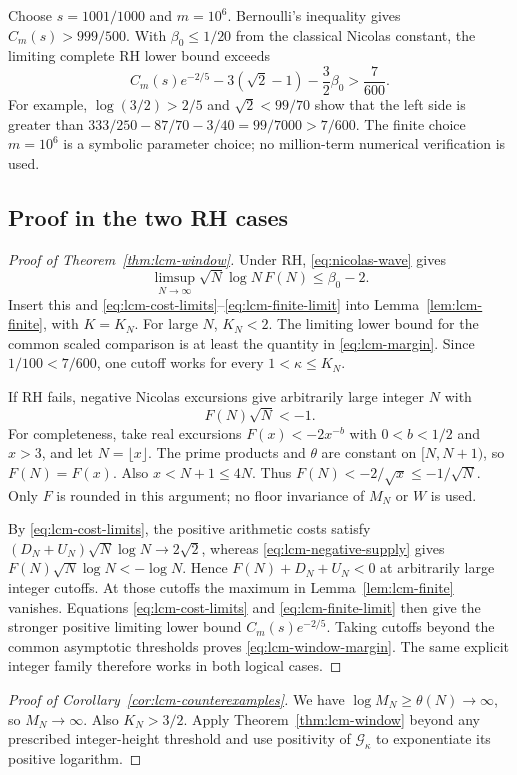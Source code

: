 \documentclass[11pt]{article}
\theoremstyle{definition}
\begin{document}
Choose $s=1001/1000$ and $m=10^6$. Bernoulli's inequality gives
$C_m(s)>999/500$. With $\beta_0\le1/20$ from the classical
Nicolas constant, the limiting complete RH lower bound exceeds
\begin{equation}\label{eq:lcm-margin}
 C_m(s)e^{-2/5}-3(\sqrt2-1)-\frac32\beta_0>\frac7{600}.
\end{equation}
For example, $\log(3/2)>2/5$ and $\sqrt2<99/70$ show that the
left side is greater than
$333/250-87/70-3/40=99/7000>7/600$.
The finite choice $m=10^6$ is a symbolic parameter choice; no
million-term numerical verification is used.

\subsection{Proof in the two RH cases}
\begin{proof}[Proof of Theorem~\ref{thm:lcm-window}]
Under RH, \eqref{eq:nicolas-wave} gives
\[
 \limsup_{N\to\infty}\sqrt N\log N\,F(N)\le\beta_0-2.
\]
Insert this and \eqref{eq:lcm-cost-limits}--\eqref{eq:lcm-finite-limit}
into Lemma~\ref{lem:lcm-finite}, with $K=K_N$.
For large $N$, $K_N<2$. The limiting lower bound for the common
scaled comparison is at least the quantity in \eqref{eq:lcm-margin}.
Since $1/100<7/600$, one cutoff works for every
$1<\kappa\le K_N$.

If RH fails, negative Nicolas excursions give arbitrarily large
integer $N$ with
\begin{equation}\label{eq:lcm-negative-supply}
 F(N)\sqrt N<-1.
\end{equation}
For completeness, take real excursions $F(x)<-2x^{-b}$ with
$0<b<1/2$ and $x>3$, and let $N=\lfloor x\rfloor$.
The prime products and $\theta$ are constant on $[N,N+1)$, so
$F(N)=F(x)$. Also $x<N+1\le4N$. Thus
$F(N)<-2/\sqrt{x}\le-1/\sqrt N$. Only $F$ is rounded in
this argument; no floor invariance of $M_N$ or $W$ is used.

By \eqref{eq:lcm-cost-limits}, the positive arithmetic costs satisfy
$(D_N+U_N)\sqrt N\log N\to2\sqrt2$, whereas
\eqref{eq:lcm-negative-supply} gives
$F(N)\sqrt N\log N<-\log N$. Hence $F(N)+D_N+U_N<0$
at arbitrarily large integer cutoffs. At those cutoffs the maximum
in Lemma~\ref{lem:lcm-finite} vanishes. Equations
\eqref{eq:lcm-cost-limits} and \eqref{eq:lcm-finite-limit} then give
the stronger positive limiting lower bound $C_m(s)e^{-2/5}$.
Taking cutoffs beyond the common asymptotic thresholds proves
\eqref{eq:lcm-window-margin}. The same explicit integer family
therefore works in both logical cases.
\end{proof}
\begin{proof}[Proof of Corollary~\ref{cor:lcm-counterexamples}]
We have $\log M_N\ge\theta(N)\to\infty$, so $M_N\to\infty$.
Also $K_N>3/2$. Apply Theorem~\ref{thm:lcm-window} beyond any
prescribed integer-height threshold and use positivity of
$\mathcal G_\kappa$ to exponentiate its positive logarithm.
\end{proof}
\end{document}
